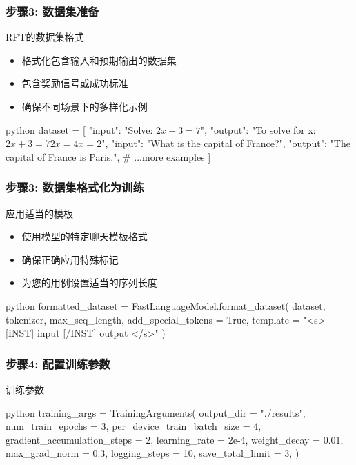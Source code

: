 \documentclass[aspectratio=169]{beamer}
\begin{document}
\begin{frame}[fragile]
	\frametitle{步骤3: 数据集准备}
	\begin{block}{RFT的数据集格式}
		\begin{itemize}
			\item 格式化包含输入和预期输出的数据集
			\item 包含奖励信号或成功标准
			\item 确保不同场景下的多样化示例
		\end{itemize}
	\end{block}
	\begin{mintedbox}{python}
dataset = [
    {"input": "Solve: $2x + 3 = 7$", 
     "output": "To solve for x:\n$2x + 3 = 7$\n$2x = 4$\n$x = 2$"},
    {"input": "What is the capital of France?", 
     "output": "The capital of France is Paris."},
    # ...more examples
]
	\end{mintedbox}
\end{frame}

\begin{frame}[fragile]
	\frametitle{步骤3: 数据集格式化为训练}
	\begin{block}{应用适当的模板}
		\begin{itemize}
			\item 使用模型的特定聊天模板格式
			\item 确保正确应用特殊标记
			\item 为您的用例设置适当的序列长度
		\end{itemize}
	\end{block}
	\begin{mintedbox}{python}
formatted_dataset = FastLanguageModel.format_dataset(
    dataset,
    tokenizer,
    max_seq_length,
    add_special_tokens = True,
    template = "<s>[INST] {input} [/INST] {output} </s>"
)
	\end{mintedbox}
\end{frame}

\begin{frame}[fragile]
	\frametitle{步骤4: 配置训练参数}
	\begin{block}{训练参数}
	\begin{mintedbox}{python}
training_args = TrainingArguments(
    output_dir = "./results",
    num_train_epochs = 3,
    per_device_train_batch_size = 4,
    gradient_accumulation_steps = 2,
    learning_rate = 2e-4,
    weight_decay = 0.01,
    max_grad_norm = 0.3,
    logging_steps = 10,
    save_total_limit = 3,
)
	\end{mintedbox}
	\end{block}
\end{frame}
\end{document}
